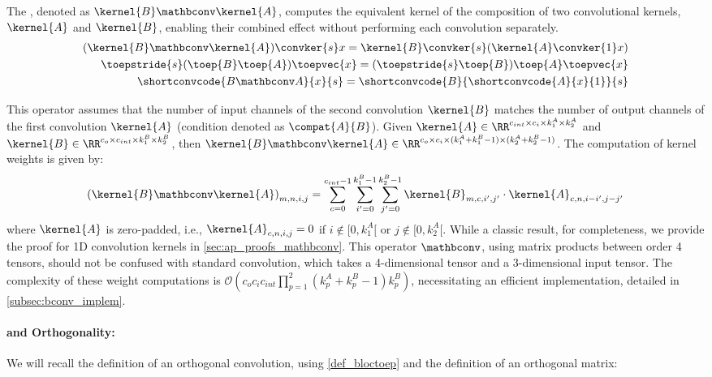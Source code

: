 \begin{definition}  
    The \Bconv, denoted as $\kernel{B} \mathbconv \kernel{A}$, computes the equivalent kernel of the composition of two convolutional kernels, $\kernel{A}$ and $\kernel{B}$, enabling their combined effect without performing each convolution separately.
    \begin{align}
        (\kernel{B} \mathbconv \kernel{A}) \convker{s} x = \kernel{B} \convker{s} (\kernel{A} \convker{1} x ) \label{def_blocker}\\
        \toepstride{s} (\toep{B} \toep{A}) \toepvec{x} = (\toepstride{s} \toep{B}) \toep{A} \toepvec{x} \label{def_bloctoep} \\
        \shortconvcode{B \mathbconv A}{x}{s} = \shortconvcode{B}{\shortconvcode{A}{x}{1}}{s} \label{def_bloccode}
    \end{align}
\end{definition}
\noindent This operator assumes that the number of input channels of the second convolution $\kernel{B}$ matches the number of output channels of the first convolution $\kernel{A}$ (condition denoted as $\compat{A}{B}$). Given $\kernel{A} \in \RR^{c_{int} \times c_i \times k_1^A \times k_2^A}$ and $\kernel{B} \in \RR^{c_o \times c_{int} \times k_1^B \times k_2^B}$, then $\kernel{B} \mathbconv \kernel{A} \in \RR^{c_o \times c_i \times (k_1^A + k_1^B - 1) \times (k_2^A + k_2^B - 1)}$. 
The computation of \Bconv{} kernel weights is given by:
\begin{equation}
\label{eq:blockconv}
   {(\kernel{B} \mathbconv \kernel{A})}_{m,n,i,j} = \sum_{c = 0}^{c_{int}-1} \sum_{i' = 0}^{k_1^B - 1} \sum_{j' = 0}^{k_2^B - 1} \kernel{B}_{m,c,i',j'} \cdot \kernel{A}_{c,n,i - i',j - j'} 
\end{equation}
where $\kernel{A}$ is zero-padded, i.e., $\kernel{A}_{c,n,i,j} = 0$ if $i \notin [0, k_1^A[$ or $j \notin [0, k_2^A[$. While a classic result, for completeness, we provide the proof for 1D convolution kernels in \cref{sec:ap_proofs_mathbconv}. This operator $\mathbconv$, using matrix products between order 4 tensors, should not be confused with standard convolution, which takes a 4-dimensional tensor and a 3-dimensional input tensor. The complexity of these weight computations is $\mathcal{O}(c_o c_i c_{int} \prod\limits_{p=1}^{2} (k_p^A + k_p^B - 1) k_p^B)$, necessitating an efficient implementation, detailed in  \cref{subsec:bconv_implem}.

    \paragraph{\Bconv{} and Orthogonality:} We will recall the definition of an orthogonal convolution, using \cref{def_bloctoep} and the definition of an orthogonal matrix:

